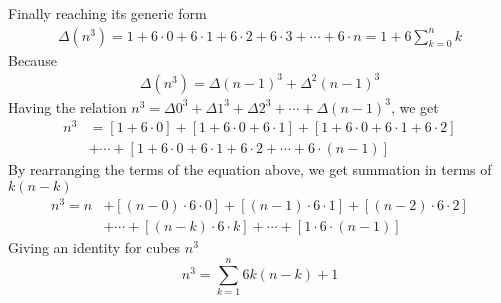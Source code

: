 Finally reaching its generic form
\begin{align*}
    \Delta(n^3) = 1+6\cdot0+6\cdot1+6\cdot2+6\cdot3+\cdots+6\cdot n = 1 + 6 \sum_{k=0}^{n} k
\end{align*}
Because
\begin{align*}
    \Delta(n^3) = \Delta (n-1)^3 + \Delta^2 (n-1)^3
\end{align*}
Having the relation $n^3 = \Delta 0^3 + \Delta 1^3 + \Delta 2^3 + \cdots + \Delta (n-1)^3$,
we get
\begin{align*}
    n^3 &= [1+6\cdot0]+[1+6\cdot0+6\cdot1]+[1+6\cdot0+6\cdot1+6\cdot2] \nonumber \\
    &+ \cdots + [1+6\cdot0+6\cdot1+6\cdot2+\cdots+6\cdot(n-1)]
\end{align*}
By rearranging the terms of the equation above, we get summation in terms of $k (n-k)$
\begin{equation*}
    \begin{split}
        n^3 = n &+ [(n-0) \cdot 6 \cdot 0] + [(n-1)\cdot6\cdot1] + [(n-2)\cdot6\cdot2] \\
                &+ \cdots + [(n-k)\cdot 6 \cdot k] + \cdots + [1\cdot6\cdot(n-1)]
    \end{split}
\end{equation*}
Giving an identity for cubes $n^3$
\begin{equation}
    \label{eq:cube_identity}
    n^3 = \sum_{k=1}^{n} 6k(n-k) + 1
\end{equation}
